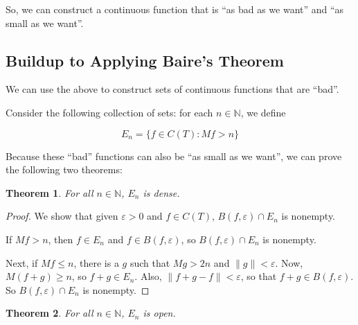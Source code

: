 \documentclass{amsart}
\newcommand{\vep}{\varepsilon}
\newcommand{\N}{\mathbb{N}}
\newcommand{\norm}[1]{\|#1\|}
\newtheorem{thm}{Theorem}[section]
\theoremstyle{definition}
\begin{document}
So, we can construct a continuous function that is ``as bad as we want'' and ``as small as we want''. 

\subsection{Buildup to Applying Baire's Theorem}

We can use the above to construct sets of continuous functions that are ``bad''.

Consider the following collection of sets: for each $n \in \N$, we define

\begin{displaymath}
E_n = \{f \in C(T) : Mf > n\}
\end{displaymath}

Because these ``bad'' functions can also be ``as small as we want'', we can prove the following two theorems:

\begin{thm}
For all $n \in \N$, $E_n$ is dense.
\end{thm}

\begin{proof}

We show that given $\vep>0$ and $f \in C(T)$, $B(f,\vep) \cap E_n$ is nonempty. 

If $Mf > n$, then $f \in E_n$ and $f \in B(f, \vep)$, so $B(f, \vep) \cap E_n$ is nonempty.

Next, if $Mf \leq n$, there is a $g$ such that $Mg > 2n$ and $\norm{g} < \vep$. 
Now, $M(f+g) \geq n$, so $f+g \in E_n$. 
Also, $\norm{f+g -f} < \vep$, so that $f+g \in B(f, \vep)$. 
So $B(f, \vep) \cap E_n$ is nonempty.

\end{proof}

\begin{thm}
For all $n \in \N$, $E_n$ is open.
\end{thm}
\end{document}
